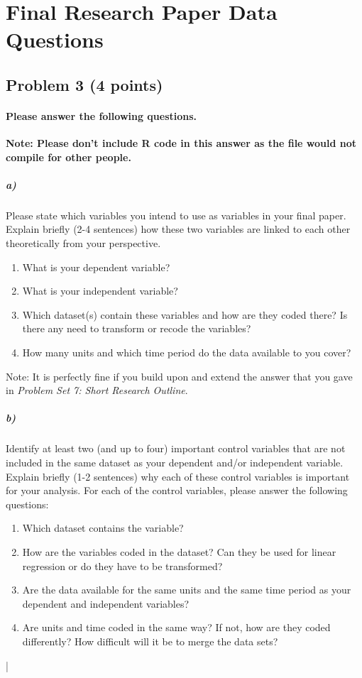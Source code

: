 \documentclass[12pt]{article}
\begin{document}
\section*{Final Research Paper Data Questions}

\subsection*{Problem 3 (4 points)}

\paragraph{Please answer the following questions.}

\textbf{Note: Please don't include R code in this answer as the file would not compile for other people.} 

\subparagraph{a)} Please state which variables you intend to use as variables in your final paper. Explain briefly (2-4 sentences) how these two variables are linked to each other theoretically from your perspective.

\begin{enumerate}
	\item What is your dependent variable?
	\item What is your independent variable?
	\item Which dataset(s) contain these variables and how are they coded there? Is there any need to transform or recode the variables?
	\item How many units and which time period do the data available to you cover?
\end{enumerate}

Note: It is perfectly fine if you build upon and extend the answer that you gave in \textit{Problem Set 7: Short Research Outline}.

\subparagraph{b)} Identify at least two (and up to four) important control variables that are not included in the same dataset as your dependent and/or independent variable. Explain briefly (1-2 sentences) why each of these control variables is important for your analysis. For each of the control variables, please answer the following questions:

\begin{enumerate}
	\item Which dataset contains the variable?
	\item How are the variables coded in the dataset? Can they be used for linear regression or do they have to be transformed?
	\item Are the data available for the same units and the same time period as your dependent and independent variables?
	\item Are units and time coded in the same way? If not, how are they coded differently? How difficult will it be to merge the data sets?
\end{enumerate}|
\end{document}
